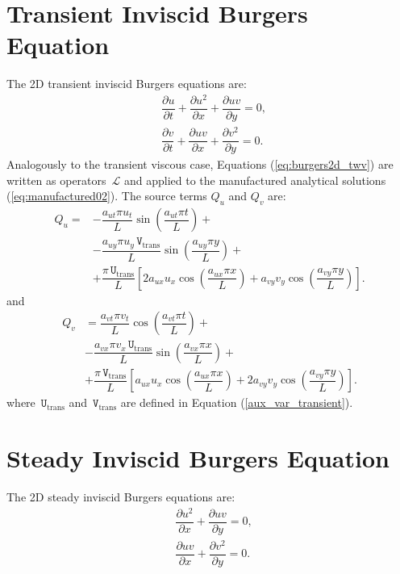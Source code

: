 \documentclass[10pt]{article}
\newcommand{\diff}[2] {\dfrac{\partial #1}{\partial #2}}
\newcommand{\Lo}{\,\mathcal{L}}
\newcommand{\U}{\,\mathtt{U}}
\newcommand{\V}{\,\mathtt{V}}
\begin{document}
\section{Transient Inviscid Burgers Equation}

The 2D transient inviscid Burgers  equations are:
\begin{equation}
 \label{eq:burgers2d_twv}
\begin{split}
 &\diff{ u}{t} + \diff{ u^2 }{x}+\diff{uv}{y}=0,\\
& \diff{ v}{t}+ \diff{ u v}{x} + \diff{  v^2 }{y}=0.
\end{split}
\end{equation}
%
Analogously to the transient viscous case, Equations (\ref{eq:burgers2d_twv}) are written as  operators $\Lo$ and applied to the manufactured analytical solutions (\ref{eq:manufactured02}). The source terms $Q_u$ and $Q_v$ are:
\begin{equation}
\begin{split}\label{sourceQu_twv}
Q_u = &- \dfrac{a_{ut} \pi u_t}{L}\sin\left(\dfrac{a_{ut} \pi t}{L}\right)+\\
 &-\dfrac{a_{uy} \pi u_y \V_\text{trans} }{L}\sin\left(\dfrac{a_{uy} \pi y}{L}\right)+\\
 &+\dfrac{\pi \U_\text{trans}}{L}\left[2 a_{ux} u_x \cos\left(\dfrac{a_{ux} \pi x}{L}\right)+a_{vy} v_y \cos\left(\dfrac{a_{vy} \pi y}{L}\right)\right].
\end{split}
 \end{equation}
and
\begin{equation}
\begin{split}
Q_v &= \dfrac{a_{vt} \pi v_t }{L}\cos\left(\dfrac{a_{vt} \pi t}{L}\right)+\\
 &-\dfrac{a_{vx} \pi v_x \U_\text{trans} }{L}\sin\left(\dfrac{a_{vx} \pi x}{L}\right)+\\
 &+\dfrac{\pi \V_\text{trans}}{L}\left[a_{ux} u_x \cos\left(\dfrac{a_{ux} \pi x}{L}\right)+2 a_{vy} v_y \cos\left(\dfrac{a_{vy} \pi y}{L}\right)\right] .
\end{split}
\end{equation}
where  $\U_\text{trans}$ and $\V_\text{trans}$ are defined in  Equation (\ref{aux_var_transient}).

\section{Steady Inviscid Burgers Equation}

The 2D steady inviscid Burgers  equations are:
\begin{equation}
 \label{eq:burgers2d_swv}
\begin{split}
&\diff{ u^2 }{x}+\diff{uv}{y}=0,\\
& \diff{ u v}{x} + \diff{  v^2 }{y}=0.
\end{split}
\end{equation}
\end{document}
